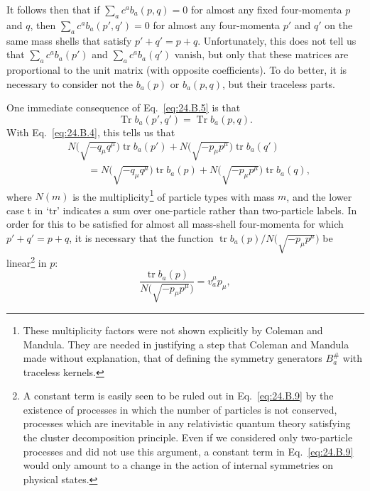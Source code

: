 It follows then that if $\sum_a c^a b_a(p,q)=0$ for almost any
fixed four-momenta $p$ and $q$, then
$\sum_a c^a b_a(p',q')=0$ for almost any four-momenta $p'$ and
$q'$ on the same mass shells that satisfy $p'+q'=p+q$. Unfortunately, this
does not tell us that $\sum_a c^a b_a(p')$ and
$\sum_a c^a b_a(q')$ vanish, but only that these matrices are
proportional to the unit matrix (with opposite coefficients). To do better, it
is necessary to consider not the $b_a(p)$ or $b_a(p,q)$, but their
traceless parts.

One immediate consequence of Eq.~\eqref{eq:24.B.5} is that
\begin{equation}
 \operatorname{Tr}b_a(p',q')
 =\operatorname{Tr}b_a(p,q).
\tag{24.B.7}\label{eq:24.B.7}
\end{equation}
With Eq.~\eqref{eq:24.B.4}, this tells us that
\begin{equation}
\begin{aligned}
 &N\bigl(\sqrt{-q_\mu q^\mu}\bigr)\operatorname{tr}b_a(p')
 +N\bigl(\sqrt{-p_\mu p^\mu}\bigr)\operatorname{tr}b_a(q')
 \\
 &\qquad
 =N\bigl(\sqrt{-q_\mu q^\mu}\bigr)\operatorname{tr}b_a(p)
 +N\bigl(\sqrt{-p_\mu p^\mu}\bigr)\operatorname{tr}b_a(q),
\end{aligned}
\tag{24.B.8}\label{eq:24.B.8}
\end{equation}
where $N(m)$ is the multiplicity\footnote{These multiplicity factors were not
shown explicitly by Coleman and Mandula. They are needed in justifying a step
that Coleman and Mandula made without explanation, that of defining the
symmetry generators $B_a^\#$ with traceless kernels.} of particle types
with mass $m$, and the lower case t in `tr' indicates a sum over one-particle
rather than two-particle labels. In order for this to be satisfied for almost
all mass-shell four-momenta for which $p'+q'=p+q$, it is necessary that the
function
$\operatorname{tr}b_a(p)/N\bigl(\sqrt{-p_\mu p^\mu}\bigr)$ be
linear\footnote{A constant term is easily seen to be ruled out in
Eq.~\eqref{eq:24.B.9} by the existence of processes in which the number of
particles is not conserved, processes which are inevitable in any relativistic
quantum theory satisfying the cluster decomposition principle. Even if we
considered only two-particle processes and did not use this argument, a
constant term in Eq.~\eqref{eq:24.B.9} would only amount to a change in the
action of internal symmetries on physical states.} in $p$:
\begin{equation}
 \frac{\operatorname{tr}b_a(p)}
 {N\bigl(\sqrt{-p_\mu p^\mu}\bigr)}
 =v_a^\mu p_\mu,
\tag{24.B.9}\label{eq:24.B.9}
\end{equation}
